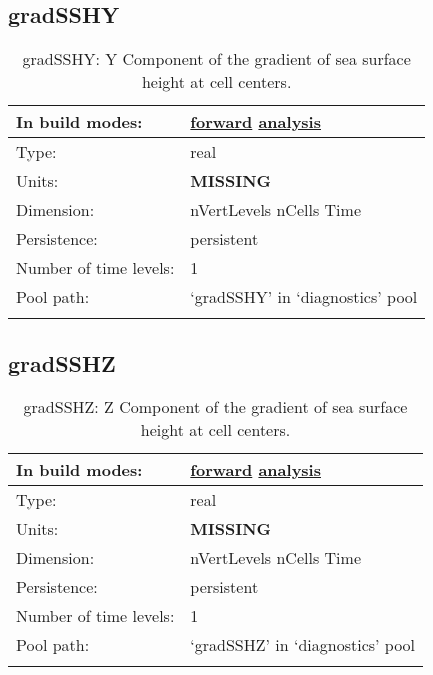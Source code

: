 \subsection[gradSSHY]{gradSSHY}
\label{subsec:var_sec_diagnostics_gradSSHY}
\begin{center}
\begin{longtable}{| p{2.0in} | p{4.0in} |}
        \hline 
        In build modes: & \hyperref[subsec:forward_var_tab_diagnostics]{forward} \hyperref[subsec:analysis_var_tab_diagnostics]{analysis} \\
        \hline 
        Type: & real \\
        \hline 
        Units: & {\bf \color{red} MISSING} \\
        \hline 
        Dimension: & nVertLevels nCells Time \\
        \hline 
        Persistence: & persistent \\
        \hline 
        Number of time levels: & 1 \\
        \hline 
            Pool path: & `gradSSHY' in `diagnostics' pool \\
		 \hline 
    \caption{gradSSHY: Y Component of the gradient of sea surface height at cell centers.}
\end{longtable}
\end{center}
\subsection[gradSSHZ]{gradSSHZ}
\label{subsec:var_sec_diagnostics_gradSSHZ}
\begin{center}
\begin{longtable}{| p{2.0in} | p{4.0in} |}
        \hline 
        In build modes: & \hyperref[subsec:forward_var_tab_diagnostics]{forward} \hyperref[subsec:analysis_var_tab_diagnostics]{analysis} \\
        \hline 
        Type: & real \\
        \hline 
        Units: & {\bf \color{red} MISSING} \\
        \hline 
        Dimension: & nVertLevels nCells Time \\
        \hline 
        Persistence: & persistent \\
        \hline 
        Number of time levels: & 1 \\
        \hline 
            Pool path: & `gradSSHZ' in `diagnostics' pool \\
		 \hline 
    \caption{gradSSHZ: Z Component of the gradient of sea surface height at cell centers.}
\end{longtable}
\end{center}
